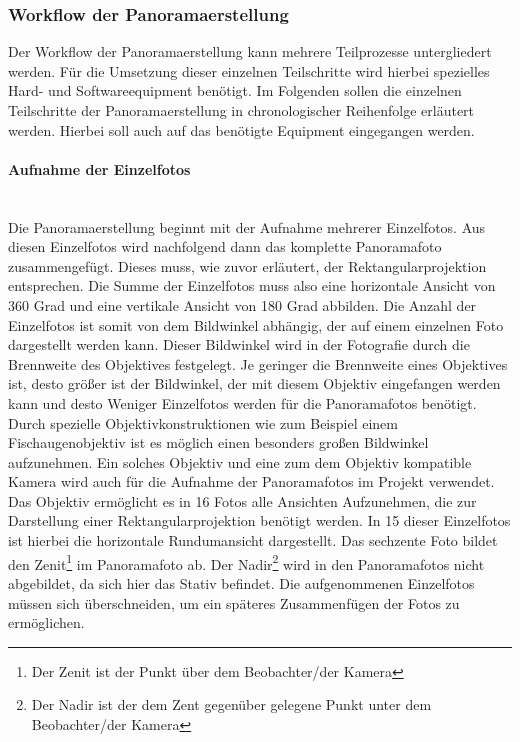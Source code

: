 \subsubsection{Workflow der Panoramaerstellung}
\label{sec:Workflow}

Der Workflow der Panoramaerstellung kann mehrere Teilprozesse untergliedert
werden. Für die Umsetzung dieser einzelnen Teilschritte wird hierbei spezielles
Hard- und Softwareequipment benötigt. Im Folgenden sollen die einzelnen
Teilschritte der Panoramaerstellung in chronologischer Reihenfolge erläutert
werden. Hierbei soll auch auf das benötigte Equipment eingegangen werden.

\paragraph{Aufnahme der Einzelfotos} \hfill \\

Die Panoramaerstellung beginnt mit der Aufnahme mehrerer Einzelfotos. Aus diesen
Einzelfotos wird nachfolgend dann das komplette Panoramafoto zusammengefügt.
Dieses muss, wie zuvor erläutert, der Rektangularprojektion entsprechen. Die
Summe der Einzelfotos muss also eine horizontale Ansicht von 360 Grad und eine
vertikale Ansicht von 180 Grad abbilden. Die Anzahl der Einzelfotos ist somit
von dem Bildwinkel abhängig, der auf einem einzelnen Foto dargestellt werden
kann. Dieser Bildwinkel wird in der Fotografie durch die Brennweite des
Objektives festgelegt. Je geringer die Brennweite eines Objektives ist, desto
größer ist der Bildwinkel, der mit diesem Objektiv eingefangen werden kann und
desto Weniger Einzelfotos werden für die Panoramafotos benötigt. Durch
spezielle Objektivkonstruktionen wie zum Beispiel einem Fischaugenobjektiv ist
es möglich einen besonders großen Bildwinkel aufzunehmen. Ein solches Objektiv
und eine zum dem Objektiv kompatible Kamera wird auch für die Aufnahme der
Panoramafotos im Projekt verwendet. Das Objektiv ermöglicht es in 16 Fotos alle
Ansichten Aufzunehmen, die zur Darstellung einer Rektangularprojektion benötigt
werden. In 15 dieser Einzelfotos ist hierbei die horizontale Rundumansicht
dargestellt. Das sechzente Foto bildet den Zenit\footnote{Der Zenit ist der
Punkt über dem Beobachter/der Kamera} im Panoramafoto ab. Der
Nadir\footnote{Der Nadir ist der dem Zent gegenüber gelegene Punkt unter dem
Beobachter/der Kamera} wird in den Panoramafotos nicht abgebildet, da sich hier
das Stativ befindet. Die aufgenommenen Einzelfotos müssen sich überschneiden,
um ein späteres Zusammenfügen der Fotos zu ermöglichen.

